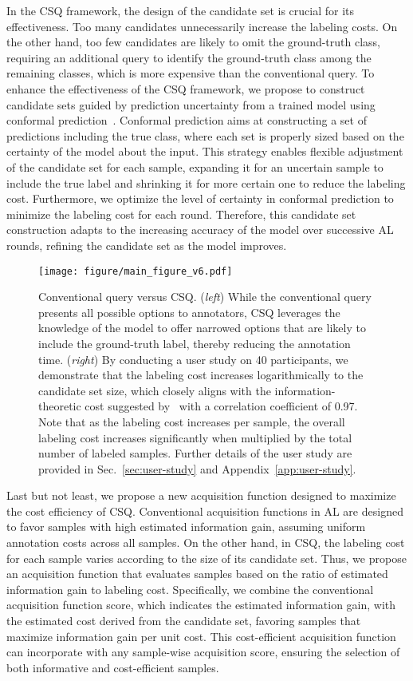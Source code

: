 In the CSQ framework, the design of the candidate set is crucial for its effectiveness.
Too many candidates unnecessarily increase the labeling costs.
On the other hand, too few candidates are likely to omit the ground-truth class, requiring an additional query to identify the ground-truth class among the remaining classes, which is more expensive than the conventional query.
To enhance the effectiveness of the CSQ framework, we propose to construct candidate sets guided by prediction uncertainty from a trained model using conformal prediction~\citep{shafer2008tutorial, angelopoulos-gentle}.
Conformal prediction aims at constructing a set of predictions including the true class, where each set is properly sized based on the certainty of the model about the input.
This strategy enables flexible adjustment of the candidate set for each sample, expanding it for an uncertain sample to include the true label and shrinking it for more certain one to reduce the labeling cost.
Furthermore, we optimize the level of certainty in conformal prediction to minimize the labeling cost for each round.
Therefore, this candidate set construction adapts to the increasing accuracy of the model over successive AL rounds, refining the candidate set as the model improves.

\begin{figure*}
    \centering
    \texttt{[image: figure/main\_figure\_v6.pdf]}
    \caption{
    Conventional query versus CSQ.
    (\emph{left}) While the conventional query presents all possible options to annotators, CSQ leverages the knowledge of the model to offer narrowed options that are likely to include the ground-truth label, thereby reducing the annotation time.
    (\emph{right}) By conducting a user study on 40 participants, we demonstrate that the labeling cost increases logarithmically to the candidate set size, which closely aligns with the information-theoretic cost suggested by~\citet{hu2020one} with a correlation coefficient of 0.97.
    Note that as the labeling cost increases per sample, the overall labeling cost increases significantly when multiplied by the total number of labeled samples.
    Further details of the user study are provided in Sec.~\ref{sec:user-study} and Appendix~\ref{app:user-study}.}
    \label{fig:teaser}
\end{figure*}

Last but not least, we propose a new acquisition function designed to maximize the cost efficiency of CSQ.
Conventional acquisition functions in AL are designed to favor samples with high estimated information gain, assuming uniform annotation costs across all samples.
On the other hand, in CSQ, the labeling cost for each sample varies according to the size of its candidate set.
Thus, we propose an acquisition function that evaluates samples based on the ratio of estimated information gain to labeling cost.
Specifically, we combine the conventional acquisition function score, which indicates the estimated information gain, with the estimated cost derived from the candidate set, favoring samples that maximize information gain per unit cost.
This cost-efficient acquisition function can incorporate with any sample-wise acquisition score, ensuring the selection of both informative and cost-efficient samples.

